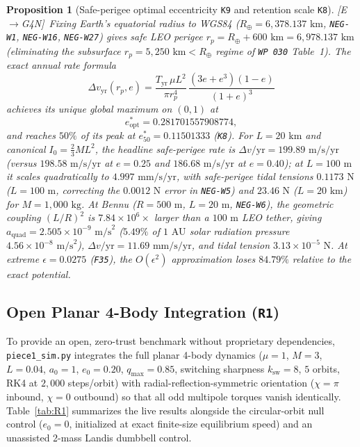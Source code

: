 \documentclass[11pt]{amsart}
\numberwithin{equation}{section}
\theoremstyle{plain}
\newtheorem{proposition}[theorem]{Proposition}
\theoremstyle{definition}\newtheorem{definition}[theorem]{Definition}
\theoremstyle{remark}\newtheorem{remark}[theorem]{Remark}
\newcommand{\ctag}[1]{\textup{\textsf{\scriptsize[#1]}}}
\begin{document}
\begin{proposition}[Safe-perigee optimal eccentricity \texttt{K9} and retention scale \texttt{K8}]\label{prop:K9}
\ctag{E$\to$G4N}\ Fixing Earth's equatorial radius to WGS84 ($R_\oplus = 6{,}378.137\text{ km}$, \texttt{NEG-W1}, \texttt{NEG-W16}, \texttt{NEG-W27}) gives safe LEO perigee $r_p = R_\oplus + 600\text{ km} = 6{,}978.137\text{ km}$ (eliminating the subsurface $r_p = 5{,}250\text{ km} < R_\oplus$ regime of \texttt{WP~030} Table~1). The exact annual rate formula
\begin{equation}\label{eq:dv_yr}
\Delta v_{\mathrm{yr}}(r_p, e) = \frac{T_{\mathrm{yr}}\,\mu L^2}{\pi r_p^4}\,\frac{(3e + e^3)(1-e)}{(1+e)^3}
\end{equation}
achieves its unique global maximum on $(0,1)$ at
\begin{equation}\label{eq:K9}
e^*_{\mathrm{opt}} = 0.281701557908774,
\end{equation}
and reaches $50\%$ of its peak at $e^*_{50} = 0.11501333$ (\texttt{K8}). For $L = 20\text{ km}$ and canonical $I_0 = \frac23 M L^2$, the headline safe-perigee rate is $\Delta v/\mathrm{yr} = 199.89\text{ m/s/yr}$ (versus $198.58\text{ m/s/yr}$ at $e=0.25$ and $186.68\text{ m/s/yr}$ at $e=0.40$); at $L = 100\text{ m}$ it scales quadratically to $4.997\text{ mm/s/yr}$, with safe-perigee tidal tensions $0.1173\text{ N}$ ($L = 100\text{ m}$, correcting the $0.0012\text{ N}$ error in \texttt{NEG-W5}) and $23.46\text{ N}$ ($L = 20\text{ km}$) for $M = 1{,}000\text{ kg}$. At Bennu ($R = 500\text{ m}$, $L = 20\text{ m}$, \texttt{NEG-W6}), the geometric coupling $(L/R)^2$ is $7.84\times 10^6\times$ larger than a $100\text{ m}$ LEO tether, giving $a_{\mathrm{quad}} = 2.505\times 10^{-9}\text{ m/s}^2$ ($5.49\%$ of $1\text{ AU}$ solar radiation pressure $4.56\times 10^{-8}\text{ m/s}^2$), $\Delta v/\mathrm{yr} = 11.69\text{ mm/s/yr}$, and tidal tension $3.13\times 10^{-5}\text{ N}$. At extreme $\epsilon = 0.0275$ (\texttt{F35}), the $O(\epsilon^2)$ approximation loses $84.79\%$ relative to the exact potential.
\end{proposition}

\subsection{Open Planar 4-Body Integration (\texttt{R1})}
To provide an open, zero-trust benchmark without proprietary dependencies, \texttt{piece1\_sim.py} integrates the full planar 4-body dynamics ($\mu = 1$, $M = 3$, $L = 0.04$, $a_0 = 1$, $e_0 = 0.20$, $q_{\max} = 0.85$, switching sharpness $k_{\mathrm{sw}} = 8$, $5$ orbits, RK4 at $2{,}000$ steps/orbit) with radial-reflection-symmetric orientation ($\chi = \pi$ inbound, $\chi = 0$ outbound) so that all odd multipole torques vanish identically. Table~\ref{tab:R1} summarizes the live results alongside the circular-orbit null control ($e_0 = 0$, initialized at exact finite-size equilibrium speed) and an unassisted 2-mass Landis dumbbell control.
\end{document}
